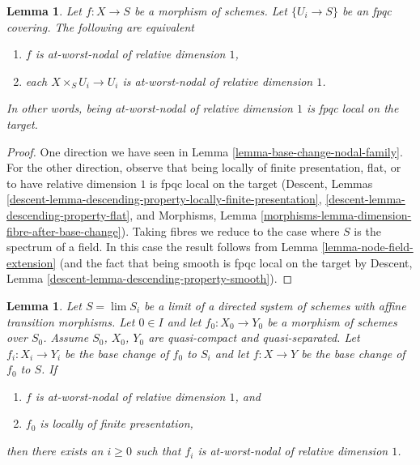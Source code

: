 \documentclass{stacks-project}
\theoremstyle{plain}
\newtheorem{lemma}[subsection]{Lemma}
\theoremstyle{definition}
\theoremstyle{remark}
\numberwithin{equation}{subsection}
\def\lim{\mathop{\mathrm{lim}}\nolimits}
\begin{document}
\begin{lemma}
\label{lemma-nodal-family-fpqc-local-target}
Let $f : X \to S$ be a morphism of schemes. Let $\{U_i \to S\}$
be an fpqc covering. The following are equivalent
\begin{enumerate}
\item $f$ is at-worst-nodal of relative dimension $1$,
\item each $X \times_S U_i \to U_i$ is at-worst-nodal of relative
dimension $1$.
\end{enumerate}
In other words, being at-worst-nodal of relative dimension $1$
is fpqc local on the target.
\end{lemma}

\begin{proof}
One direction we have seen in Lemma \ref{lemma-base-change-nodal-family}.
For the other direction, observe that being locally of finite
presentation, flat, or to have relative dimension $1$
is fpqc local on the target
(Descent, Lemmas
\ref{descent-lemma-descending-property-locally-finite-presentation},
\ref{descent-lemma-descending-property-flat}, and
Morphisms, Lemma \ref{morphisms-lemma-dimension-fibre-after-base-change}).
Taking fibres we reduce
to the case where $S$ is the spectrum of a field. In this case the
result follows from Lemma \ref{lemma-node-field-extension}
(and the fact that being smooth is fpqc local on the target by
Descent, Lemma \ref{descent-lemma-descending-property-smooth}).
\end{proof}

\begin{lemma}
\label{lemma-descend-nodal-family}
Let $S = \lim S_i$ be a limit of a directed system of schemes
with affine transition morphisms.
Let $0 \in I$ and let $f_0 : X_0 \to Y_0$ be a morphism of schemes over $S_0$.
Assume $S_0$, $X_0$, $Y_0$ are quasi-compact and quasi-separated.
Let $f_i : X_i \to Y_i$ be the base change of $f_0$ to $S_i$ and
let $f : X \to Y$ be the base change of $f_0$ to $S$.
If
\begin{enumerate}
\item $f$ is at-worst-nodal of relative dimension $1$, and
\item $f_0$ is locally of finite presentation,
\end{enumerate}
then there exists an $i \geq 0$ such that $f_i$ is at-worst-nodal
of relative dimension $1$.
\end{lemma}
\end{document}
